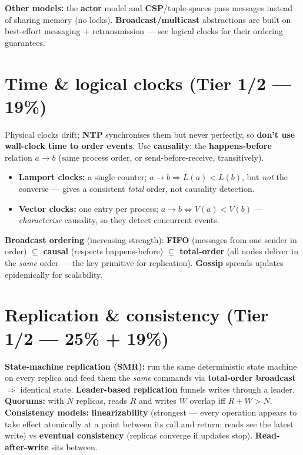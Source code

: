 \documentclass[11pt,a4paper]{article}
\begin{document}
\begin{useful}
\textbf{Other models:} the \textbf{actor} model and \textbf{CSP}/tuple-spaces pass messages instead of sharing memory (no locks). \textbf{Broadcast/multicast} abstractions are built on best-effort messaging $+$ retransmission --- see logical clocks for their ordering guarantees.
\end{useful}

\section{Time \& logical clocks (Tier 1/2 --- 19\%)}

\begin{must}
Physical clocks drift; \textbf{NTP} synchronises them but never perfectly, so \textbf{don't use wall-clock time to order events}. Use \textbf{causality}: the \textbf{happens-before} relation $a\to b$ (same process order, or send-before-receive, transitively).
\begin{itemize}[leftmargin=*,itemsep=0pt]
  \item \textbf{Lamport clocks:} a single counter; $a\to b \Rightarrow L(a)<L(b)$, but \emph{not} the converse --- gives a consistent \emph{total} order, not causality detection.
  \item \textbf{Vector clocks:} one entry per process; $a\to b \iff V(a)<V(b)$ --- \emph{characterise} causality, so they detect concurrent events.
\end{itemize}
\end{must}

\begin{useful}
\textbf{Broadcast ordering} (increasing strength): \textbf{FIFO} (messages from one sender in order) $\subseteq$ \textbf{causal} (respects happens-before) $\subseteq$ \textbf{total-order} (all nodes deliver in the \emph{same} order --- the key primitive for replication). \textbf{Gossip} spreads updates epidemically for scalability.
\end{useful}

\section{Replication \& consistency (Tier 1/2 --- 25\% + 19\%)}

\begin{must}
\textbf{State-machine replication (SMR):} run the same deterministic state machine on every replica and feed them the \emph{same} commands via \textbf{total-order broadcast} $\Rightarrow$ identical state. \textbf{Leader-based replication} funnels writes through a leader. \textbf{Quorums:} with $N$ replicas, reads $R$ and writes $W$ overlap iff $R+W>N$.\\[2pt]
\textbf{Consistency models:} \textbf{linearizability} (strongest --- every operation appears to take effect atomically at a point between its call and return; reads see the latest write) vs \textbf{eventual consistency} (replicas converge if updates stop). \textbf{Read-after-write} sits between.
\end{must}
\end{document}
